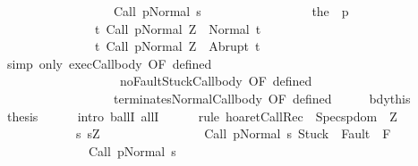 \begin{isabellebody}
\ \ \ \ \ \ \ \ \ \ \ \ \ \ \ \ \ \ {\isasymGamma}{\isasymturnstile}Call\ p{\isasymdown}Normal\ s{\isacharbraceright}{\isacharparenright}\ \isanewline
\ \ \ \ \ \ \ \ \ \ \ \ \ \ \ \ {\isacharparenleft}the\ {\isacharparenleft}{\isasymGamma}\ p{\isacharparenright}{\isacharparenright}\isanewline
\ \ \ \ \ \ \ \ \ \ \ \ \ \ \ {\isacharbraceleft}t{\isachardot}\ {\isasymGamma}{\isasymturnstile}{\isasymlangle}Call\ p{\isacharcomma}Normal\ Z{\isasymrangle}\ {\isasymRightarrow}\ Normal\ t{\isacharbraceright}{\isacharcomma}\isanewline
\ \ \ \ \ \ \ \ \ \ \ \ \ \ \ {\isacharbraceleft}t{\isachardot}\ {\isasymGamma}{\isasymturnstile}{\isasymlangle}Call\ p{\isacharcomma}Normal\ Z{\isasymrangle}\ {\isasymRightarrow}\ Abrupt\ t{\isacharbraceright}{\isachardoublequoteclose}\isanewline
\ \ \ \ \ \ \isamarkupfalse%
\ {\isacharparenleft}simp\ only{\isacharcolon}\ exec{\isacharunderscore}Call{\isacharunderscore}body{\isacharprime}\ {\isacharbrackleft}OF\ defined{\isacharbrackright}\ \isanewline
\ \ \ \ \ \ \ \ \ \ \ \ \ \ \ \ \ \ \ noFaultStuck{\isacharunderscore}Call{\isacharunderscore}body{\isacharprime}\ {\isacharbrackleft}OF\ defined{\isacharbrackright}\ \isanewline
\ \ \ \ \ \ \ \ \ \ \ \ \ \ \ \ \ \ terminates{\isacharunderscore}Normal{\isacharunderscore}Call{\isacharunderscore}body\ {\isacharbrackleft}OF\ defined{\isacharbrackright}{\isacharparenright}\isanewline
\ \ \isacommand{{\isacharbraceright}}\isamarkupfalse%
\ \isamarkupfalse%
\ bdy{\isacharequal}this\isanewline
\ \ \isamarkupfalse%
\ {\isacharquery}thesis\isanewline
\ \ \ \ \isamarkupfalse%
\ {\isacharparenleft}intro\ ballI\ allI{\isacharparenright}\isanewline
\ \ \ \ \isamarkupfalse%
\ {\isacharparenleft}rule\ hoaret{\isachardot}CallRec\ {\isacharbrackleft}\ Specs{\isacharequal}{\isachardoublequoteopen}{\isacharparenleft}{\isasymUnion}p{\isasymin}dom\ {\isasymGamma}{\isachardot}\ {\isasymUnion}Z{\isachardot}\ \isanewline
\ \ \ \ \ \ \ \ \ \ \ \ {\isacharbraceleft}{\isacharparenleft}{\isacharbraceleft}s{\isachardot}\ s{\isacharequal}Z\ {\isasymand}\ \isanewline
\ \ \ \ \ \ \ \ \ \ \ \ \ \ {\isasymGamma}{\isasymturnstile}{\isasymlangle}Call\ p{\isacharcomma}Normal\ s{\isasymrangle}\ {\isasymRightarrow}{\isasymnotin}{\isacharparenleft}{\isacharbraceleft}Stuck{\isacharbraceright}\ {\isasymunion}\ Fault\ {\isacharbackquote}\ {\isacharparenleft}{\isacharminus}F{\isacharparenright}{\isacharparenright}\ {\isasymand}\ \isanewline
\ \ \ \ \ \ \ \ \ \ \ \ \ \ {\isasymGamma}{\isasymturnstile}Call\ p{\isasymdown}Normal\ s{\isacharbraceright}{\isacharcomma}\isanewline

\end{isabellebody}
